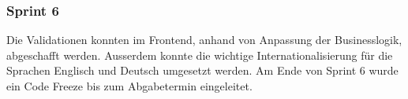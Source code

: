 \subsubsection{Sprint 6}
Die Validationen konnten im Frontend, anhand von Anpassung der Businesslogik, abgeschafft werden.
Ausserdem konnte die wichtige Internationalisierung für die Sprachen Englisch und Deutsch umgesetzt werden. 
Am Ende von Sprint 6 wurde ein Code Freeze bis zum Abgabetermin eingeleitet.


